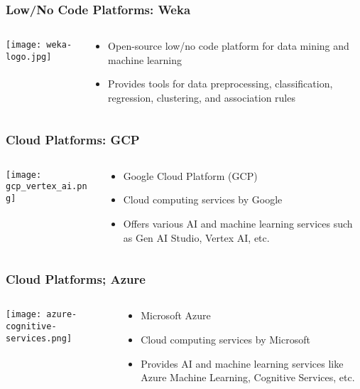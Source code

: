 \begin{frame}[fragile]\frametitle{Low/No Code Platforms: Weka}
\begin{columns}[T]
\begin{column}{.48\textwidth}
\texttt{[image: weka-logo.jpg]}
\end{column}
\begin{column}{.48\textwidth}
\begin{itemize}
\item Open-source low/no code platform for data mining and machine learning
\item Provides tools for data preprocessing, classification, regression, clustering, and association rules
\end{itemize}
\end{column}
\end{columns}
\end{frame}

\begin{frame}[fragile]\frametitle{Cloud Platforms: GCP}
\begin{columns}[T]
\begin{column}{.48\textwidth}
\texttt{[image: gcp\_vertex\_ai.png]}
\end{column}
\begin{column}{.48\textwidth}
\begin{itemize}
\item Google Cloud Platform (GCP)
\item Cloud computing services by Google
\item Offers various AI and machine learning services such as Gen AI Studio, Vertex AI, etc.
\end{itemize}
\end{column}
\end{columns}
\end{frame}

\begin{frame}[fragile]\frametitle{Cloud Platforms; Azure}
\begin{columns}[T]
\begin{column}{.48\textwidth}
\texttt{[image: azure-cognitive-services.png]}
\end{column}
\begin{column}{.48\textwidth}
\begin{itemize}
\item Microsoft Azure
\item Cloud computing services by Microsoft
\item Provides AI and machine learning services like Azure Machine Learning, Cognitive Services, etc.
\end{itemize}
\end{column}
\end{columns}
\end{frame}

